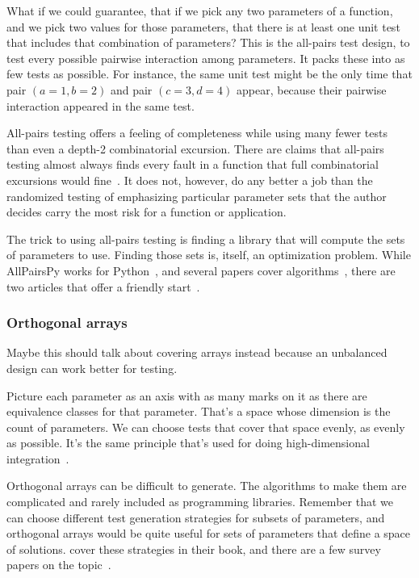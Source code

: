 \documentclass[fleqn,10pt]{olplainarticle}
\begin{document}

What if we could guarantee, that if we pick any two parameters
of a function, and we pick two values for those parameters,
that there is at least one unit test that includes that combination
of parameters? This is the all-pairs test design, to test
every possible pairwise interaction among parameters.
It packs these into as few tests as possible. For instance,
the same unit test might be the only time that pair
$(a=1, b=2)$ and pair $(c=3, d=4)$ appear, because their
pairwise interaction appeared in the same test.

All-pairs testing offers a feeling of completeness while
using many fewer tests than even a depth-2 combinatorial
excursion. There are claims that all-pairs testing almost
always finds every fault in a function that full combinatorial
excursions would fine~\citep{Pairwise}. It does not, however,
do any better a job than the randomized testing of emphasizing
particular parameter sets that the author decides carry
the most risk for a function or application.

The trick to using all-pairs testing is finding a library
that will compute the sets of parameters to use. Finding
those sets is, itself, an optimization problem.
While AllPairsPy works for Python~\citep{allpairspy},
and several papers cover algorithms~\citep{tung2000automating,pezze2008},
there are two articles that offer a friendly start~\citep{blass2002,czerwoka2006}.


\subsubsection{Orthogonal arrays}

Maybe this should talk about covering arrays instead because
an unbalanced design can work better for testing.

Picture each parameter as an axis with as many marks
on it as there are equivalence classes for that parameter.
That's a space whose dimension is the count of parameters.
We can choose tests that cover that space evenly, as evenly
as possible. It's the same principle that's used for doing
high-dimensional integration~\citep{Owen1992}.

Orthogonal arrays can
be difficult to generate. The algorithms to make them
are complicated and rarely included as programming libraries.
Remember that we can choose different test generation strategies
for subsets of parameters, and orthogonal arrays would be
quite useful for sets of parameters that define a space of
solutions.
\citet{petke2015practical} cover these strategies in their book,
and there are a few survey papers on the topic~\citep{grindal2005,nie2011survey,khalsa2014orchestrated}.
\end{document}
